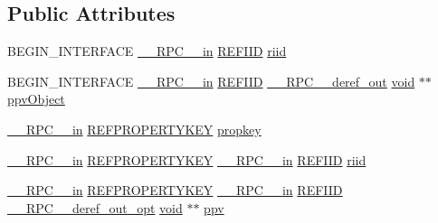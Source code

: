 \subsection*{Public Attributes}
\begin{DoxyCompactItemize}
\item 
B\+E\+G\+I\+N\+\_\+\+I\+N\+T\+E\+R\+F\+A\+CE \hyperlink{rpcsal_8h_a20b7f6da600a05c8b541659f14f7f0e6}{\+\_\+\+\_\+\+R\+P\+C\+\_\+\+\_\+in} \hyperlink{px__win__ds_8c_a80ec49c8ae61e234197d5071d2df497d}{R\+E\+F\+I\+ID} \hyperlink{struct_i_property_system_vtbl_aac0ce3818026e4c98281f171ecc252f8}{riid}
\item 
B\+E\+G\+I\+N\+\_\+\+I\+N\+T\+E\+R\+F\+A\+CE \hyperlink{rpcsal_8h_a20b7f6da600a05c8b541659f14f7f0e6}{\+\_\+\+\_\+\+R\+P\+C\+\_\+\+\_\+in} \hyperlink{px__win__ds_8c_a80ec49c8ae61e234197d5071d2df497d}{R\+E\+F\+I\+ID} \hyperlink{rpcsal_8h_a23bc188526f10656f9c79d950f6c3192}{\+\_\+\+\_\+\+R\+P\+C\+\_\+\+\_\+deref\+\_\+out} \hyperlink{sound_8c_ae35f5844602719cf66324f4de2a658b3}{void} $\ast$$\ast$ \hyperlink{struct_i_property_system_vtbl_a89b4b62c97acc18fe37a782b344a112d}{ppv\+Object}
\item 
\hyperlink{rpcsal_8h_a20b7f6da600a05c8b541659f14f7f0e6}{\+\_\+\+\_\+\+R\+P\+C\+\_\+\+\_\+in} \hyperlink{propkeydef_8h_a3e01280fe3a0b979f5a1926d5a8754af}{R\+E\+F\+P\+R\+O\+P\+E\+R\+T\+Y\+K\+EY} \hyperlink{struct_i_property_system_vtbl_afd840bd8c70ba0e40293ce2c045cb389}{propkey}
\item 
\hyperlink{rpcsal_8h_a20b7f6da600a05c8b541659f14f7f0e6}{\+\_\+\+\_\+\+R\+P\+C\+\_\+\+\_\+in} \hyperlink{propkeydef_8h_a3e01280fe3a0b979f5a1926d5a8754af}{R\+E\+F\+P\+R\+O\+P\+E\+R\+T\+Y\+K\+EY} \hyperlink{rpcsal_8h_a20b7f6da600a05c8b541659f14f7f0e6}{\+\_\+\+\_\+\+R\+P\+C\+\_\+\+\_\+in} \hyperlink{px__win__ds_8c_a80ec49c8ae61e234197d5071d2df497d}{R\+E\+F\+I\+ID} \hyperlink{struct_i_property_system_vtbl_a0ebf5886f23b11d5a77b176f1562b27b}{riid}
\item 
\hyperlink{rpcsal_8h_a20b7f6da600a05c8b541659f14f7f0e6}{\+\_\+\+\_\+\+R\+P\+C\+\_\+\+\_\+in} \hyperlink{propkeydef_8h_a3e01280fe3a0b979f5a1926d5a8754af}{R\+E\+F\+P\+R\+O\+P\+E\+R\+T\+Y\+K\+EY} \hyperlink{rpcsal_8h_a20b7f6da600a05c8b541659f14f7f0e6}{\+\_\+\+\_\+\+R\+P\+C\+\_\+\+\_\+in} \hyperlink{px__win__ds_8c_a80ec49c8ae61e234197d5071d2df497d}{R\+E\+F\+I\+ID} \hyperlink{rpcsal_8h_ab29e89ceb0eb0b075c6f6299b0de6a21}{\+\_\+\+\_\+\+R\+P\+C\+\_\+\+\_\+deref\+\_\+out\+\_\+opt} \hyperlink{sound_8c_ae35f5844602719cf66324f4de2a658b3}{void} $\ast$$\ast$ \hyperlink{struct_i_property_system_vtbl_abdbde6c1f99486480ea2e034033b4309}{ppv}

\end{DoxyCompactItemize}

